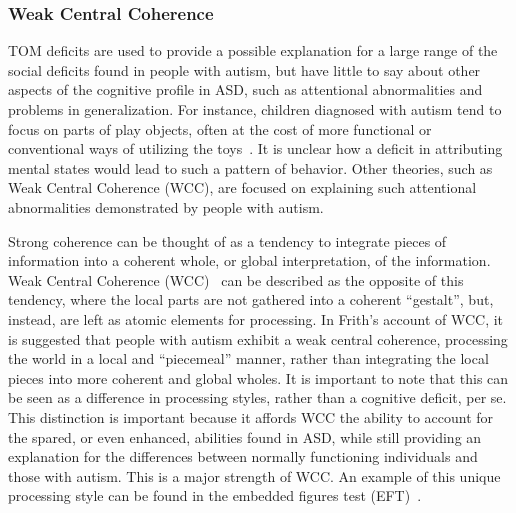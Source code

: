 \documentclass[man]{apa}
\begin{document}


\subsubsection{Weak Central Coherence}

TOM deficits are used to provide a possible explanation for a large range of the social deficits found in people with
autism, but have little to say about other aspects of the cognitive profile in ASD, such as
attentional abnormalities and problems in generalization.  For instance, children diagnosed with autism tend to focus on parts of play objects, often at the cost of more functional or conventional ways of utilizing the toys~\cite{RefWorks:123,RefWorks:124}.  It is unclear how a deficit in attributing mental states would lead to such a pattern of behavior.  Other theories, such as Weak Central Coherence (WCC), are focused on explaining such attentional abnormalities demonstrated by people with autism. 

Strong coherence can be thought of as a tendency to integrate pieces of information into a coherent whole, or global interpretation, of the information. Weak Central Coherence (WCC)~\cite{HappeF:1999:WCC,RefWorks:116}  can be described as the opposite of this tendency, where the local parts are not gathered into a coherent ``gestalt'', but, instead, are left as atomic elements for processing. In Frith's account of WCC, it is suggested that people with autism exhibit a weak central coherence, processing the world in a local and ``piecemeal'' manner, rather than integrating the local pieces into more coherent and global wholes. It is important to note that this can be seen as a difference in processing styles, rather than a cognitive deficit, per se. This distinction is important because it affords WCC the ability to account for the spared, or even enhanced, abilities found in ASD, while still providing an explanation for the differences between normally functioning individuals and those with autism. This is a major strength of WCC. An example of this unique processing style can be found in the embedded figures test (EFT)~\cite{WitkinHA:1971:EFT}.  
\end{document}

